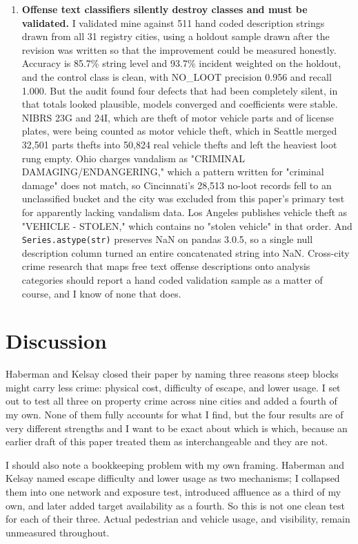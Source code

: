 \documentclass[12pt,letterpaper]{article}
\begin{document}
\begin{enumerate}
\item \textbf{Offense text classifiers silently destroy classes and must be
validated.} I validated mine against 511 hand coded description strings drawn from all
31 registry cities, using a holdout sample drawn after the revision was written so
that the improvement could be measured honestly. Accuracy is 85.7\% string level and
93.7\% incident weighted on the holdout, and the control class is clean, with NO\_LOOT
precision 0.956 and recall 1.000. But the audit found four defects that had been
completely silent, in that totals looked plausible, models converged and coefficients
were stable. NIBRS 23G and 24I, which are theft of motor vehicle parts and of license
plates, were being counted as motor vehicle theft, which in Seattle merged 32,501
parts thefts into 50,824 real vehicle thefts and left the heaviest loot rung empty.
Ohio charges vandalism as "CRIMINAL DAMAGING/ENDANGERING," which a pattern written for
"criminal damage" does not match, so Cincinnati's 28,513 no-loot records fell to an
unclassified bucket and the city was excluded from this paper's primary test for
apparently lacking vandalism data. Los Angeles publishes vehicle theft as
"VEHICLE - STOLEN," which contains no "stolen vehicle" in that order. And
\texttt{Series.astype(str)} preserves NaN on pandas 3.0.5, so a single null
description column turned an entire concatenated string into NaN. Cross-city crime
research that maps free text offense descriptions onto analysis categories should
report a hand coded validation sample as a matter of course, and I know of none that
does.
\end{enumerate}

\section{Discussion}

Haberman and Kelsay closed their paper by naming three reasons steep blocks might
carry less crime: physical cost, difficulty of escape, and lower usage. I set out to
test all three on property crime across nine cities and added a fourth of my own.
None of them fully accounts for what I find, but the four results are of very different
strengths and I want to be exact about which is which, because an earlier draft of
this paper treated them as interchangeable and they are not.

I should also note a bookkeeping problem with my own framing. Haberman and Kelsay
named escape difficulty and lower usage as two mechanisms; I collapsed them into one
network and exposure test, introduced affluence as a third of my own, and later added
target availability as a fourth. So this is not one clean test for each of their
three. Actual pedestrian and vehicle usage, and visibility, remain unmeasured
throughout.
\end{document}
